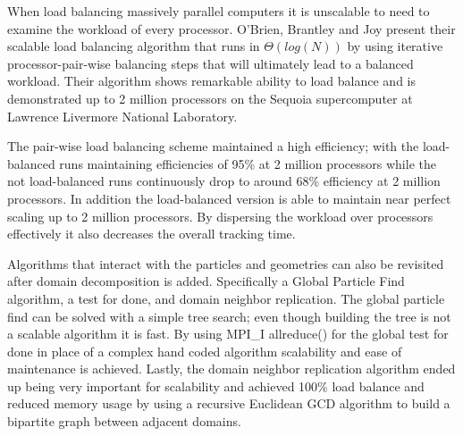 %
When load balancing massively parallel computers it is unscalable to need to examine the workload of every processor.
%
O'Brien, Brantley and Joy present their scalable load balancing algorithm that runs in $\Theta ( log ( N ) )$ by using iterative processor-pair-wise balancing steps that will ultimately lead to a balanced workload.
%
Their algorithm shows remarkable ability to load balance and is demonstrated up to 2 million processors on the Sequoia supercomputer at Lawrence Livermore National Laboratory.
~\cite{o2013scalable}
%

%
The pair-wise load balancing scheme maintained a high efficiency; with the load-balanced runs maintaining efficiencies of 95\% at 2 million processors while the not load-balanced runs continuously drop to around 68\% efficiency at 2 million processors.
%
In addition the load-balanced version is able to maintain near perfect scaling up to 2 million processors.
%
By dispersing the workload over processors effectively it also decreases the overall tracking time.
~\cite{o2013scalable}
%

Algorithms that interact with the particles and geometries can also be revisited after domain decomposition is added.
%
Specifically a Global Particle Find algorithm, a test for done, and domain neighbor replication.
%
The global particle find can be solved with a simple tree search; even though building the tree is not a scalable algorithm it is fast.
%
By using MPI\_I allreduce() for the global test for done in place of a complex hand coded algorithm scalability and ease of maintenance is achieved.
%
Lastly, the domain neighbor replication algorithm ended up being very important for scalability and achieved 100\% load balance and reduced memory usage by using a recursive Euclidean GCD algorithm to build a bipartite graph between adjacent domains. ~\cite{o2015particle}
%


